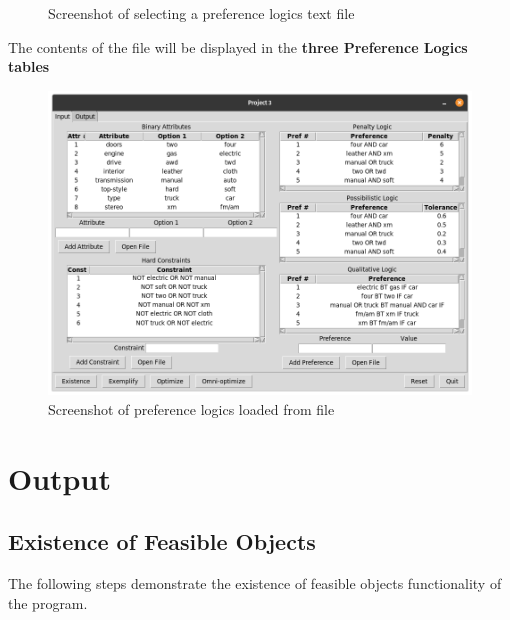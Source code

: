 \documentclass[12pt]{report}
\begin{document}
\begin{description}[leftmargin=4em]
\begin{figure}[H]
\begin{center}
\caption{Screenshot of selecting a preference logics text file}
\end{center}
\end{figure}
\vspace{-2.5em}
\item [Result:] The contents of the file will be displayed in the \textbf{three Preference Logics tables}
\begin{figure}[H]
\begin{center}
\includegraphics[scale=0.275,trim=1cm 1cm 1cm 1cm]{preferences_imported}
\caption{Screenshot of preference logics loaded from file}
\end{center}
\end{figure}
\vspace{-2.5em}
\end{description}


\chapter{Output}
\section{Existence of Feasible Objects}
The following steps demonstrate the existence of feasible objects functionality of the program.\\
\end{document}
